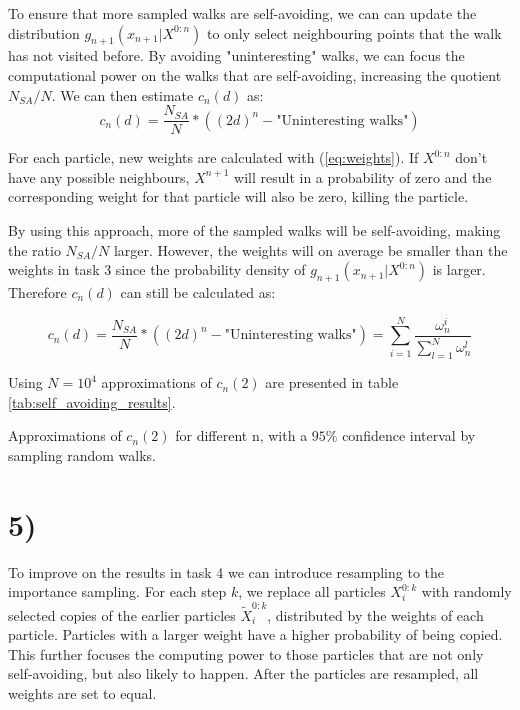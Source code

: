 \documentclass[a4paper]{article}
\begin{document}
To ensure that more sampled walks are self-avoiding, we can can update the distribution $g_{n+1}(x_{n+1}|X^{0:n})$ to only select neighbouring points that the walk has not visited before. By avoiding "uninteresting" walks, we can focus the computational power on the walks that are self-avoiding, increasing the quotient $N_{SA}/N$. We can then estimate $c_n(d)$ as:
\begin{equation}
    c_n(d) = \frac{N_{SA}}{N} * ((2d)^n - \text{"Uninteresting walks"})
\end{equation}

For each particle, new weights are calculated with (\ref{eq:weights}). If $X^{0:n}$ don't have any possible neighbours, $X^{n+1}$ will result in a probability of zero and the corresponding weight for that particle will also be zero, killing the particle.

By using this approach, more of the sampled walks will be self-avoiding, making the ratio $N_{SA}/N$ larger. However, the weights will on average be smaller than the weights in task 3 since the probability density of $g_{n+1}(x_{n+1}|X^{0:n})$ is larger. Therefore $c_n(d)$ can still be calculated as:

\begin{equation}
    c_n(d) = \frac{N_{SA}}{N} * ((2d)^n - \text{"Uninteresting walks"}) = \sum_{i = 1}^N\frac{\omega_n^i}{\sum_{l=1}^N\omega_n^l}
\end{equation}

Using $N = 10^4$ approximations of $c_n(2)$ are presented in table \ref{tab:self_avoiding_results}.

\begin{table}[H]
    \centering
    \caption{Approximations of $c_n(2)$ for different n, with a $95\%$ confidence interval by sampling random walks.}
    \label{tab:self_avoiding_results}
    
\end{table}

\section*{5)}
To improve on the results in task 4 we can introduce resampling to the importance sampling. For each step $k$, we replace all particles $X_i^{0:k}$ with randomly selected copies of the earlier particles $\widetilde{X}_i^{0:k}$, distributed by the weights of each particle. Particles with a larger weight have a higher probability of being copied. This further focuses the computing power to those particles that are not only self-avoiding, but also likely to happen. After the particles are resampled, all weights are set to equal.
\end{document}

